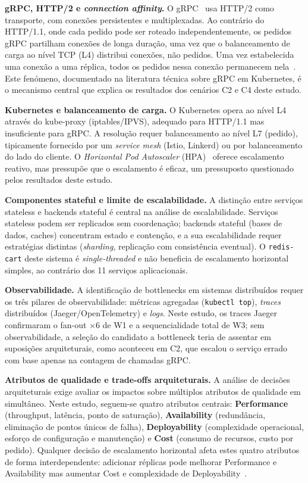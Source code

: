 \documentclass[manuscript,oneside]{acmart}
\begin{document}
\textbf{gRPC, HTTP/2 e \textit{connection affinity}.} O gRPC~\cite{grpc} usa HTTP/2 como transporte, com conexões persistentes e multiplexadas. Ao contrário do HTTP/1.1, onde cada pedido pode ser roteado independentemente, os pedidos gRPC partilham conexões de longa duração, uma vez que o balanceamento de carga ao nível TCP (L4) distribui conexões, não pedidos. Uma vez estabelecida uma conexão a uma réplica, todos os pedidos nessa conexão permanecem nela~\cite{grpcloadbalancing,k8sgrpc}. Este fenómeno, documentado na literatura técnica sobre gRPC em Kubernetes, é o mecanismo central que explica os resultados dos cenários C2 e C4 deste estudo.

\textbf{Kubernetes e balanceamento de carga.} O Kubernetes opera ao nível L4 através do kube-proxy (iptables/IPVS), adequado para HTTP/1.1 mas insuficiente para gRPC. A resolução requer balanceamento ao nível L7 (pedido), tipicamente fornecido por um \textit{service mesh} (Istio, Linkerd) ou por balanceamento do lado do cliente. O \textit{Horizontal Pod Autoscaler} (HPA)~\cite{k8shpa} oferece escalamento reativo, mas pressupõe que o escalamento é eficaz, um pressuposto questionado pelos resultados deste estudo.

\textbf{Componentes stateful e limite de escalabilidade.} A distinção entre serviços stateless e backends stateful é central na análise de escalabilidade. Serviços stateless podem ser replicados sem coordenação; backends stateful (bases de dados, caches) concentram estado e contenção, e a sua escalabilidade requer estratégias distintas (\textit{sharding}, replicação com consistência eventual). O \texttt{redis-cart} deste sistema é \textit{single-threaded} e não beneficia de escalamento horizontal simples, ao contrário dos 11 serviços aplicacionais.

\textbf{Observabilidade.} A identificação de bottlenecks em sistemas distribuídos requer os três pilares de observabilidade: métricas agregadas (\texttt{kubectl top}), \textit{traces} distribuídos (Jaeger/OpenTelemetry) e \textit{logs}. Neste estudo, os traces Jaeger confirmaram o fan-out ×6 de W1 e a sequencialidade total de W3; sem observabilidade, a seleção do candidato a bottleneck teria de assentar em suposições arquiteturais, como aconteceu em C2, que escalou o serviço errado com base apenas na contagem de chamadas gRPC.

\textbf{Atributos de qualidade e trade-offs arquiteturais.} A análise de decisões arquiteturais exige avaliar os impactos sobre múltiplos atributos de qualidade em simultâneo. Neste estudo, seguem-se quatro atributos centrais: \textbf{Performance} (throughput, latência, ponto de saturação), \textbf{Availability} (redundância, eliminação de pontos únicos de falha), \textbf{Deployability} (complexidade operacional, esforço de configuração e manutenção) e \textbf{Cost} (consumo de recursos, custo por pedido). Qualquer decisão de escalamento horizontal afeta estes quatro atributos de forma interdependente: adicionar réplicas pode melhorar Performance e Availability mas aumentar Cost e complexidade de Deployability~\cite{newman}.
\end{document}
